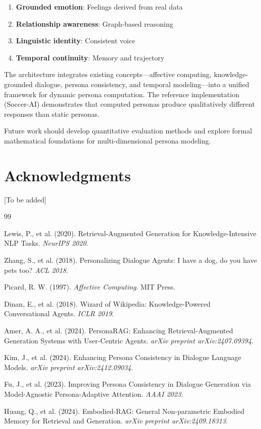 \documentclass[11pt]{article}
\begin{document}
\begin{enumerate}
    \item \textbf{Grounded emotion}: Feelings derived from real data
    \item \textbf{Relationship awareness}: Graph-based reasoning
    \item \textbf{Linguistic identity}: Consistent voice
    \item \textbf{Temporal continuity}: Memory and trajectory
\end{enumerate}

The architecture integrates existing concepts---affective computing, knowledge-grounded dialogue, persona consistency, and temporal modeling---into a unified framework for dynamic persona computation. The reference implementation (Soccer-AI) demonstrates that computed personas produce qualitatively different responses than static personas.

Future work should develop quantitative evaluation methods and explore formal mathematical foundations for multi-dimensional persona modeling.

\section*{Acknowledgments}
[To be added]


\begin{thebibliography}{99}

Lewis, P., et al. (2020).
Retrieval-Augmented Generation for Knowledge-Intensive NLP Tasks.
\textit{NeurIPS 2020}.

Zhang, S., et al. (2018).
Personalizing Dialogue Agents: I have a dog, do you have pets too?
\textit{ACL 2018}.

Picard, R. W. (1997).
\textit{Affective Computing}.
MIT Press.

Dinan, E., et al. (2018).
Wizard of Wikipedia: Knowledge-Powered Conversational Agents.
\textit{ICLR 2019}.

Amer, A. A., et al. (2024).
PersonaRAG: Enhancing Retrieval-Augmented Generation Systems with User-Centric Agents.
\textit{arXiv preprint arXiv:2407.09394}.

Kim, J., et al. (2024).
Enhancing Persona Consistency in Dialogue Language Models.
\textit{arXiv preprint arXiv:2412.09034}.

Fu, J., et al. (2023).
Improving Persona Consistency in Dialogue Generation via Model-Agnostic Persona-Adaptive Attention.
\textit{AAAI 2023}.

Huang, Q., et al. (2024).
Embodied-RAG: General Non-parametric Embodied Memory for Retrieval and Generation.
\textit{arXiv preprint arXiv:2409.18313}.

\end{thebibliography}
\end{document}
